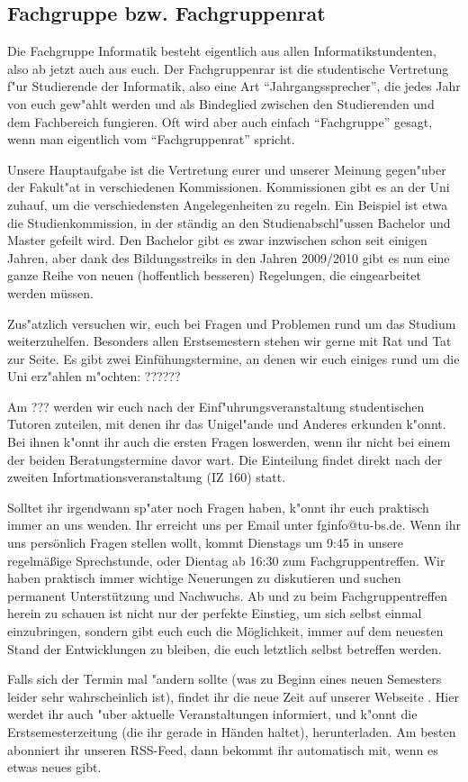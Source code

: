 \subsection{Fachgruppe bzw. Fachgruppenrat}

Die Fachgruppe Informatik besteht eigentlich aus allen 
Informatikstundenten, also ab jetzt auch aus euch. Der Fachgruppenrar 
ist die studentische Vertretung f"ur Studierende der Informatik, also 
eine Art "`Jahrgangssprecher"', die jedes Jahr von euch gew"ahlt werden 
und als Bindeglied zwischen den Studierenden und dem Fachbereich 
fungieren. Oft wird aber auch einfach "`Fachgruppe"' gesagt, wenn man 
eigentlich vom "`Fachgruppenrat"' spricht.

Unsere Hauptaufgabe ist die Vertretung eurer und unserer Meinung 
gegen"uber der Fakult"at in verschiedenen Kommissionen. Kommissionen 
gibt es an der Uni zuhauf, um die verschiedensten Angelegenheiten zu 
regeln. Ein Beispiel ist etwa die Studienkommission, in der ständig 
an den Studienabschl"ussen Bachelor und Master gefeilt wird. Den Bachelor 
gibt es zwar inzwischen schon seit einigen Jahren, aber dank des 
Bildungsstreiks in den Jahren 2009/2010 gibt es nun eine ganze Reihe 
von neuen (hoffentlich besseren) Regelungen, die eingearbeitet werden 
müssen.

Zus"atzlich versuchen wir, euch bei Fragen und Problemen rund um das 
Studium weiterzuhelfen. Besonders allen Erstsemestern stehen wir 
gerne mit Rat und Tat zur Seite. 
Es gibt zwei Einfühungstermine, an denen wir euch einiges rund um die 
Uni erz"ahlen m"ochten: ??????

Am ??? werden wir euch nach der Einf"uhrungsveranstaltung studentischen 
Tutoren zuteilen, mit denen ihr das Unigel"ande und Anderes erkunden 
k"onnt. Bei ihnen k"onnt ihr auch die ersten Fragen loswerden, wenn 
ihr nicht bei einem der beiden Beratungstermine davor wart.
Die Einteilung findet direkt nach der zweiten Infortmationsveranstaltung 
(IZ 160) statt.

Solltet ihr irgendwann sp"ater noch Fragen haben, k"onnt ihr euch 
praktisch immer an uns wenden. Ihr erreicht uns per Email unter 
fginfo@tu-bs.de. Wenn ihr uns persönlich Fragen stellen wollt, kommt 
Dienstags um 9:45 in unsere regelmäßige Sprechstunde, oder Dientag ab 
16:30 zum Fachgruppentreffen. Wir haben praktisch immer wichtige 
Neuerungen zu diskutieren und suchen permanent Unterstützung und 
Nachwuchs. Ab und zu beim Fachgruppentreffen herein zu schauen ist 
nicht nur der perfekte Einstieg, um sich selbst einmal einzubringen, 
sondern gibt euch euch die Möglichkeit, immer auf dem neuesten Stand 
der Entwicklungen zu bleiben, die euch letztlich selbst betreffen werden.

Falls sich der Termin mal "andern sollte (was zu Beginn eines neuen 
Semesters leider sehr wahrscheinlich ist), findet ihr die neue Zeit 
auf unserer Webseite \mbox{}. Hier 
werdet ihr auch "uber aktuelle Veranstaltungen informiert, und k"onnt 
die Erstsemesterzeitung (die ihr gerade in Händen haltet), herunterladen. 
Am besten abonniert ihr unseren RSS-Feed, dann bekommt ihr automatisch 
mit, wenn es etwas neues gibt.